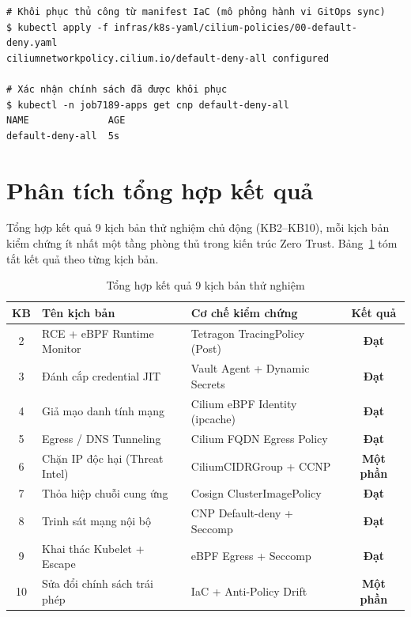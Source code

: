 \begin{listing}[H]
\begin{verbatim}
# Khôi phục thủ công từ manifest IaC (mô phỏng hành vi GitOps sync)
$ kubectl apply -f infras/k8s-yaml/cilium-policies/00-default-deny.yaml
ciliumnetworkpolicy.cilium.io/default-deny-all configured

# Xác nhận chính sách đã được khôi phục
$ kubectl -n job7189-apps get cnp default-deny-all
NAME              AGE
default-deny-all  5s
\end{verbatim}
\caption{Khôi phục chính sách từ IaC manifest --- minh chứng nguyên tắc Anti-Policy Drift}
\label{lst:kb10_recover_res}
\end{listing}

\section{Phân tích tổng hợp kết quả}
\label{sec:analysis}

Tổng hợp kết quả 9 kịch bản thử nghiệm chủ động (KB2--KB10), mỗi kịch bản kiểm chứng ít nhất một tầng phòng thủ trong kiến trúc Zero Trust. Bảng~\ref{tab:scenario_summary} tóm tắt kết quả theo từng kịch bản.

\begin{table}[H]
\centering
\caption{Tổng hợp kết quả 9 kịch bản thử nghiệm}
\label{tab:scenario_summary}
\begin{tabular}{|c|p{4.2cm}|p{3.5cm}|c|}
\hline
\textbf{KB} & \textbf{Tên kịch bản} & \textbf{Cơ chế kiểm chứng} & \textbf{Kết quả} \\
\hline
2  & RCE + eBPF Runtime Monitor    & Tetragon TracingPolicy (Post) & \textbf{Đạt} \\
\hline
3  & Đánh cắp credential JIT       & Vault Agent + Dynamic Secrets & \textbf{Đạt} \\
\hline
4  & Giả mạo danh tính mạng        & Cilium eBPF Identity (ipcache) & \textbf{Đạt} \\
\hline
5  & Egress / DNS Tunneling         & Cilium FQDN Egress Policy     & \textbf{Đạt} \\
\hline
6  & Chặn IP độc hại (Threat Intel) & CiliumCIDRGroup + CCNP        & \textbf{Một phần} \\
\hline
7  & Thỏa hiệp chuỗi cung ứng      & Cosign ClusterImagePolicy     & \textbf{Đạt} \\
\hline
8  & Trinh sát mạng nội bộ          & CNP Default-deny + Seccomp    & \textbf{Đạt} \\
\hline
9  & Khai thác Kubelet + Escape     & eBPF Egress + Seccomp         & \textbf{Đạt} \\
\hline
10 & Sửa đổi chính sách trái phép   & IaC + Anti-Policy Drift       & \textbf{Một phần} \\
\hline
\end{tabular}
\end{table}

